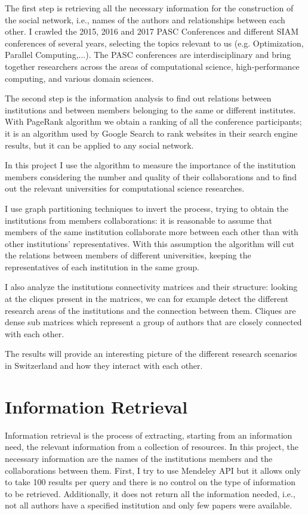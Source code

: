 \documentclass[]{usiinfbachelorproject}
\begin{document}
The first step is retrieving all the necessary information for the construction of the social network, i.e., names of the authors and relationships between each other. I crawled the 2015, 2016 and 2017 PASC Conferences and different SIAM conferences of several years, selecting the topics relevant to us (e.g. Optimization, Parallel Computing,...). The PASC conferences are interdisciplinary and bring together researchers across the areas of computational science, high-performance computing, and various domain sciences.

The second step is the information analysis to find out relations between institutions and between members belonging to the same or different institutes. With PageRank algorithm we obtain a ranking of all the conference participants; it is an algorithm used by Google Search to rank websites in their search engine results, but it can be applied to any social network. 

In this project I use the algorithm to measure the importance of the institution members considering the number and quality of their collaborations and to find out the relevant universities for computational science researches. 

I use graph partitioning techniques to invert the process, trying to obtain the institutions from members collaborations: it is reasonable to assume that members of the same institution collaborate more between each other than with other institutions' representatives. With this assumption the algorithm will cut the relations between members of different universities, keeping the representatives of each institution in the same group.

I also analyze the institutions connectivity matrices and their structure: looking at the cliques present in the matrices, we can for example detect the different research areas of the institutions and the connection between them. Cliques are dense sub matrices which represent a group of authors that are closely connected with each other. 

The results will provide an interesting picture of the different research scenarios in Switzerland and how they interact with each other.






\section{Information Retrieval} \label{sec:inforetrieval} 
Information retrieval is the process of extracting, starting from an information need, the relevant information from a collection of resources. In this project, the necessary information are the names of the institutions members and the collaborations between them. 
First, I try to use Mendeley API but it allows only to take 100 results per query and there is no control on the type of information to be retrieved. Additionally, it does not return all the information needed, i.e., not all authors have a specified institution and only few papers were available.
\end{document}
